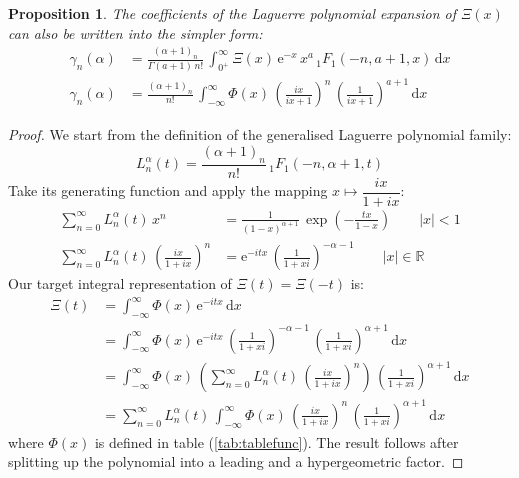 \documentclass[a4paper,11pt,twoside]{amsart}
\newtheorem{proposition}[theorem]{Proposition}
\begin{document}
\begin{proposition}
The coefficients of the Laguerre polynomial expansion of $\Xi(x)$ can also be written into the simpler form: 
\begin{align}
\gamma_n(\alpha) &= \frac{(\alpha+1)_n}{\Gamma(a+1)\,n!}\,\int_{0^+}^{\infty} \Xi(x)\,\mathrm{e}^{-x}\,x^a\,{}_1F_1(-n,a+1,x)\,\mathrm{d}x \\
\gamma_n(\alpha) &= \frac{(\alpha+1)_n}{n!}\,\int_{-\infty}^{\infty} \Phi(x)\,\left(\frac{ix}{ix+1}\right)^n\,\left(\frac{1}{ix+1}\right)^{a+1}\,\mathrm{d}x
\end{align}
\end{proposition}
\begin{proof}
We start from the definition of the generalised Laguerre polynomial family:
\begin{equation}
 L^{\alpha}_n(t) = \frac{(\alpha+1)_n}{n!}\, {}_1F_1(-n, \alpha+1,t) 
\end{equation}
Take its generating function and apply the mapping $x \mapsto \dfrac{ix}{1+ix}$:
\begin{align}
 \sum_{n=0}^\infty L^{\alpha}_n(t)\, x^n &= \frac{1}{(1-x)^{\alpha+1}}\,\exp\left(-\frac{tx}{1-x}\right) \qquad |x| < 1 \\
 \sum_{n=0}^\infty L^{\alpha}_n(t)\,\left(\frac{ix}{1+ix}\right)^n &= \textrm{e}^{-itx}\,\left(\frac{1}{1+xi} \right)^{-\alpha-1} \qquad |x| \in \mathbb{R}
\end{align}
Our target integral representation of $\Xi(t) = \Xi(-t)$ is:
\begin{align}
 \Xi(t) &= \int_{-\infty}^\infty \Phi(x)\,\textrm{e}^{-itx}\, \mathrm{d}x \\
 & = \int_{-\infty}^\infty \Phi(x)\,\textrm{e}^{-itx}\,\left(\frac{1}{1+xi} \right)^{-\alpha-1}\,\left(\frac{1}{1+xi} \right)^{\alpha+1} \, \mathrm{d}x \\
 & = \int_{-\infty}^\infty \Phi(x)\,\left( \sum_{n=0}^\infty L^{\alpha}_n(t)\,\left(\frac{ix}{1+ix}\right)^n\right)\,\left(\frac{1}{1+xi} \right)^{\alpha+1} \, \mathrm{d}x \\
  &= \sum_{n=0}^\infty L^{\alpha}_n(t)\,\int_{-\infty}^\infty \Phi(x)\,\left(\frac{ix}{1+ix}\right)^n\,\left(\frac{1}{1+xi} \right)^{\alpha+1}\, \mathrm{d}x
\end{align}
where $\Phi(x)$ is defined in table (\ref{tab:tablefunc}). The result follows after splitting up the polynomial into a leading and a hypergeometric factor.
\end{proof}
\end{document}
